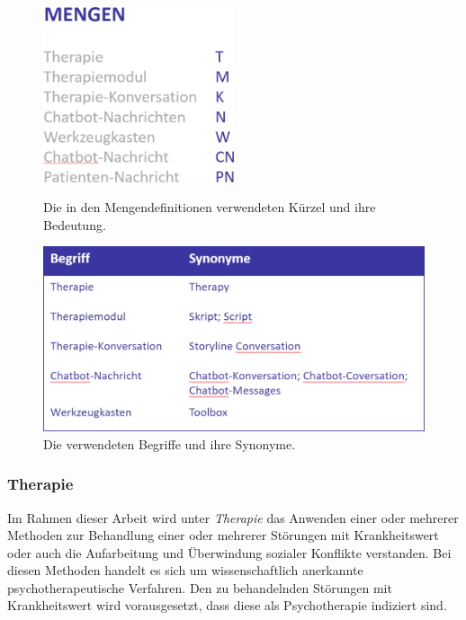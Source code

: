\begin{figure}
   \begin{minipage}[b]{.5\linewidth} %
      \includegraphics[width=0.5\textwidth]{pictures/mengen}
	   \caption{Die in den Mengendefinitionen verwendeten Kürzel und ihre Bedeutung.}
	  \label{mengen}
   \end{minipage}
   \hspace{.01\linewidth}%
   \begin{minipage}[b]{.5\linewidth} %
      \includegraphics[width=1\textwidth]{pictures/begriffe}
	  \caption{Die verwendeten Begriffe und ihre Synonyme.}
	  \label{begriffe}
   \end{minipage}
\end{figure}

\subsubsection{Therapie}
Im Rahmen dieser Arbeit wird unter \emph{Therapie} das Anwenden  einer oder mehrerer Methoden zur Behandlung einer oder mehrerer Störungen mit Krankheitswert oder auch die Aufarbeitung und Überwindung sozialer Konflikte verstanden. Bei diesen Methoden handelt es sich um wissenschaftlich anerkannte psychotherapeutische Verfahren. Den zu behandelnden Störungen mit Krankheitswert wird vorausgesetzt, dass diese als Psychotherapie indiziert sind.


